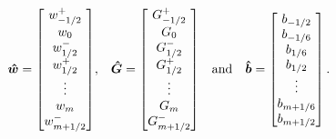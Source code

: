\begin{enumerate}[(i)]
\begin{align*}
	\boldsymbol{\hat{w}} = \begin{bmatrix}
	w^+_{-1/2} \\ w_0 \\ w^-_{1/2} \\ w^+_{1/2}  \\ \vdots \\ w_m \\ w^-_{m+1/2}\end{bmatrix} &,& \boldsymbol{\hat{G}} = \begin{bmatrix}
	G^+_{-1/2} \\ G_0 \\ G^-_{1/2} \\ G^+_{1/2}  \\ \vdots \\ G_m \\ G^-_{m+1/2}
	\end{bmatrix} & &\text{and}& & \boldsymbol{\hat{b}} = \begin{bmatrix}
	b_{-1/2} \\ b_{-1/6} \\ b_{1/6} \\ b_{1/2} \\ \vdots \\ b_{m + 1/6}\\ b_{m+1/2}
	\end{bmatrix}.
	\end{align*}
	

\end{enumerate}
